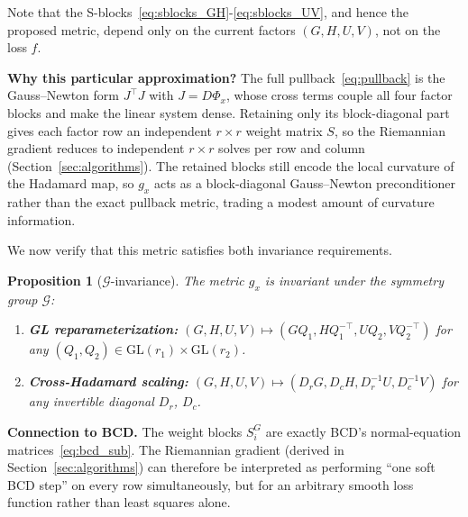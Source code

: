 \documentclass[letterpaper, 10 pt, conference]{ieeeconf}
\newcommand{\cG}{\mathcal{G}}
\theoremstyle{plain}
\newtheorem{proposition}{Proposition}
\theoremstyle{definition}
\theoremstyle{remark}
\begin{document}
Note that the S-blocks~\eqref{eq:sblocks_GH}-\eqref{eq:sblocks_UV}, and hence the proposed metric, depend only on the current factors $(G,H,U,V)$, not on the loss $f$.

\noindent \textbf{Why this particular approximation?}
The full pullback~\eqref{eq:pullback} is the Gauss--Newton form $J^\top J$ with $J = D\Phi_x$, whose cross terms couple all four factor blocks and make the linear system dense. Retaining only its block-diagonal part gives each factor row an independent $r\times r$ weight matrix $S$, so the Riemannian gradient reduces to independent $r\times r$ solves per row and column (Section~\ref{sec:algorithms}). The retained blocks still encode the local curvature of the Hadamard map, so $g_x$ acts as a block-diagonal Gauss--Newton preconditioner rather than the exact pullback metric, trading a modest amount of curvature information.




We now verify that this metric satisfies both invariance requirements.

\begin{proposition}[$\cG$-invariance]\label{prop:gauge}
The metric $g_x$ is invariant under the symmetry group $\cG$:
\begin{enumerate}[nosep,label=(\alph*)]
\item \textbf{GL reparameterization:} $(G,H,U,V)\mapsto(GQ_1, HQ_1^{-\top}, UQ_2, VQ_2^{-\top})$ for any $(Q_1,Q_2)\in\mathrm{GL}(r_1)\times\mathrm{GL}(r_2)$.
\item \textbf{Cross-Hadamard scaling:} $(G,H,U,V)\mapsto(D_rG, D_cH, D_r^{-1}U, D_c^{-1}V)$ for any invertible diagonal $D_r$, $D_c$.
\end{enumerate}
\end{proposition}

\noindent \textbf{Connection to BCD.}
The weight blocks $S_i^G$ are exactly BCD's normal-equation matrices~\eqref{eq:bcd_sub}.
The Riemannian gradient (derived in Section~\ref{sec:algorithms}) can therefore be interpreted as performing ``one soft BCD step'' on every row simultaneously, but for an arbitrary smooth loss function rather than least squares alone.
\end{document}
